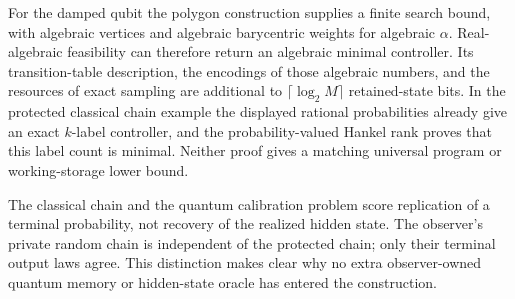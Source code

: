 For the damped qubit the polygon construction supplies a finite search bound, with algebraic vertices and algebraic barycentric weights for algebraic $\alpha$. Real-algebraic feasibility can therefore return an algebraic minimal controller. Its transition-table description, the encodings of those algebraic numbers, and the resources of exact sampling are additional to $\lceil\log_2 M\rceil$ retained-state bits. In the protected classical chain example the displayed rational probabilities already give an exact $k$-label controller, and the probability-valued Hankel rank proves that this label count is minimal. Neither proof gives a matching universal program or working-storage lower bound.

The classical chain and the quantum calibration problem score replication of a terminal probability, not recovery of the realized hidden state. The observer's private random chain is independent of the protected chain; only their terminal output laws agree. This distinction makes clear why no extra observer-owned quantum memory or hidden-state oracle has entered the construction.

